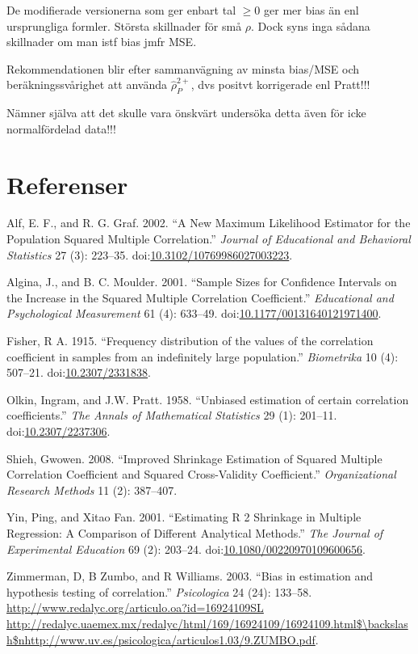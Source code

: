 \documentclass[]{article}
\begin{document}
De modifierade versionerna som ger enbart tal \(\geq 0\) ger mer bias än
enl ursprungliga formler. Största skillnader för små \(\rho\). Dock syns
inga sådana skillnader om man istf bias jmfr MSE.

Rekommendationen blir efter sammanvägning av minsta bias/MSE och
beräkningssvårighet att använda \(\hat{\rho}^{2+}_P\), dvs positvt
korrigerade enl Pratt!!!

Nämner själva att det skulle vara önskvärt undersöka detta även för icke
normalfördelad data!!!

\section*{Referenser}\label{referenser}

\hypertarget{refs}{}
\hypertarget{ref-Alf2002}{}
Alf, E. F., and R. G. Graf. 2002. ``A New Maximum Likelihood Estimator
for the Population Squared Multiple Correlation.'' \emph{Journal of
Educational and Behavioral Statistics} 27 (3): 223--35.
doi:\href{https://doi.org/10.3102/10769986027003223}{10.3102/10769986027003223}.

\hypertarget{ref-Algina2001}{}
Algina, J., and B. C. Moulder. 2001. ``Sample Sizes for Confidence
Intervals on the Increase in the Squared Multiple Correlation
Coefficient.'' \emph{Educational and Psychological Measurement} 61 (4):
633--49.
doi:\href{https://doi.org/10.1177/00131640121971400}{10.1177/00131640121971400}.

\hypertarget{ref-Fisher1915}{}
Fisher, R A. 1915. ``Frequency distribution of the values of the
correlation coefficient in samples from an indefinitely large
population.'' \emph{Biometrika} 10 (4): 507--21.
doi:\href{https://doi.org/10.2307/2331838}{10.2307/2331838}.

\hypertarget{ref-Olkin1958}{}
Olkin, Ingram, and J.W. Pratt. 1958. ``Unbiased estimation of certain
correlation coefficients.'' \emph{The Annals of Mathematical Statistics}
29 (1): 201--11.
doi:\href{https://doi.org/10.2307/2237306}{10.2307/2237306}.

\hypertarget{ref-Shieh2008}{}
Shieh, Gwowen. 2008. ``Improved Shrinkage Estimation of Squared Multiple
Correlation Coefficient and Squared Cross-Validity Coefficient.''
\emph{Organizational Research Methods} 11 (2): 387--407.

\hypertarget{ref-Yin2001}{}
Yin, Ping, and Xitao Fan. 2001. ``Estimating R 2 Shrinkage in Multiple
Regression: A Comparison of Different Analytical Methods.'' \emph{The
Journal of Experimental Education} 69 (2): 203--24.
doi:\href{https://doi.org/10.1080/00220970109600656}{10.1080/00220970109600656}.

\hypertarget{ref-Zimmerman2003}{}
Zimmerman, D, B Zumbo, and R Williams. 2003. ``Bias in estimation and
hypothesis testing of correlation.'' \emph{Psicologica} 24 (24):
133--58.
\href{http://www.redalyc.org/articulo.oa?id=16924109SL\%20http://redalyc.uaemex.mx/redalyc/html/169/16924109/16924109.html$/backslash$nhttp://www.uv.es/psicologica/articulos1.03/9.ZUMBO.pdf}{http://www.redalyc.org/articulo.oa?id=16924109SL http://redalyc.uaemex.mx/redalyc/html/169/16924109/16924109.html\$\textbackslash{}backslash\$nhttp://www.uv.es/psicologica/articulos1.03/9.ZUMBO.pdf}.
\end{document}

